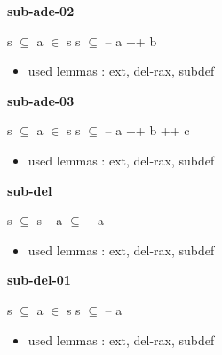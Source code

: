 \documentclass[a4paper]{article}
\begin{document}
\medskip

\bigskip

{\large\bf sub-ade-02}

\medskip

 \Fol s $\subseteq$  \And \Not a $\in$ s \Imp s $\subseteq$  -- a ++ b

\begin{itemize}


\item       used lemmas  : ext, del-rax, subdef

\end{itemize}

\medskip

\bigskip

{\large\bf sub-ade-03}

\medskip

 \Fol s $\subseteq$  \And \Not a $\in$ s \Imp s $\subseteq$  -- a ++ b ++ c

\begin{itemize}


\item       used lemmas  : ext, del-rax, subdef

\end{itemize}

\medskip

\bigskip

{\large\bf sub-del}

\medskip

 \Fol s $\subseteq$  \Imp s -- a $\subseteq$  -- a

\begin{itemize}


\item       used lemmas  : ext, del-rax, subdef

\end{itemize}

\medskip

\bigskip

{\large\bf sub-del-01}

\medskip

 \Fol s $\subseteq$  \And \Not a $\in$ s \Imp s $\subseteq$  -- a

\begin{itemize}


\item       used lemmas  : ext, del-rax, subdef

\end{itemize}
\end{document}
